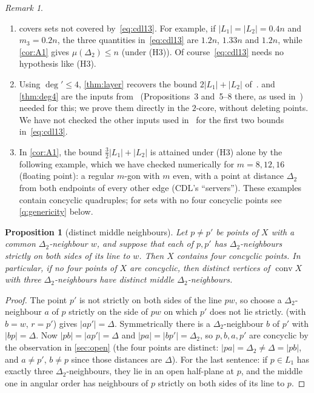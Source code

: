 \documentclass[11pt]{amsart}
\newtheorem{proposition}[theorem]{Proposition}
\theoremstyle{definition}
\theoremstyle{remark}
\newtheorem{remark}[theorem]{Remark}
\newcommand{\Dt}{\Delta_2}
\newcommand{\mult}{\mu}
\newcommand{\conv}{\operatorname{conv}}
\begin{document}
\begin{remark}\label{rem:layers}
\begin{enumerate}[leftmargin=2em,label=(\alph*)]
\item {} covers sets not covered by~\eqref{eq:cdl13}. For example, if $|L_1|=|L_2|=0.4n$ and $m_3=0.2n$, the three quantities in~\eqref{eq:cdl13} are $1.2n$, $1.33n$ and $1.2n$, while \cref{cor:A1} gives $\mult(\Dt)\le n$ (under (H3)). Of course~\eqref{eq:cdl13} needs no hypothesis like (H3).
\item Using $\deg'\le4$, \cref{thm:layer} recovers the bound $2|L_1|+|L_2|$ of~\cite[Theorem~1.3]{CDL25}.  and \cref{thm:deg4} are the inputs from~\cite{Ve96} (Propositions~3 and~5--8 there, as used in~\cite{CDL25}) needed for this; we prove them directly in the $2$-core, without deleting points. We have not checked the other inputs used in~\cite{CDL25} for the first two bounds in~\eqref{eq:cdl13}.
\item In \cref{cor:A1}, the bound $\frac32|L_1|+|L_2|$ is attained under (H3) alone by the following example, which we have checked numerically for $m=8,12,16$ (floating point): a regular $m$-gon with $m$ even, with a point at distance $\Dt$ from both endpoints of every other edge (CDL's ``servers''). These examples contain concyclic quadruples; for sets with no four concyclic points see \cref{q:genericity} below.
\end{enumerate}
\end{remark}

\begin{proposition}[distinct middle neighbours]\label{prop:middle}
Let $p\ne p'$ be points of $X$ with a common $\Dt$-neighbour $w$, and suppose that each of $p,p'$ has $\Dt$-neighbours strictly on both sides of its line to $w$. Then $X$ contains four concyclic points. In particular, if no four points of $X$ are concyclic, then distinct vertices of $\conv X$ with three $\Dt$-neighbours have distinct middle $\Dt$-neighbours.
\end{proposition}
\begin{proof}
The point $p'$ is not strictly on both sides of the line $pw$, so choose a $\Dt$-neighbour $a$ of $p$ strictly on the side of $pw$ on which $p'$ does not lie strictly.  (with $b=w$, $r=p'$) gives $|ap'|=\Delta$. Symmetrically there is a $\Dt$-neighbour $b$ of $p'$ with $|bp|=\Delta$. Now $|pb|=|ap'|=\Delta$ and $|pa|=|bp'|=\Dt$, so $p,b,a,p'$ are concyclic by the observation in \cref{sec:open} (the four points are distinct: $|pa|=\Dt\ne\Delta=|pb|$, and $a\ne p'$, $b\ne p$ since those distances are $\Delta$). For the last sentence: if $p\in L_1$ has exactly three $\Dt$-neighbours, they lie in an open half-plane at $p$, and the middle one in angular order has neighbours of $p$ strictly on both sides of its line to $p$.
\end{proof}
\end{document}

